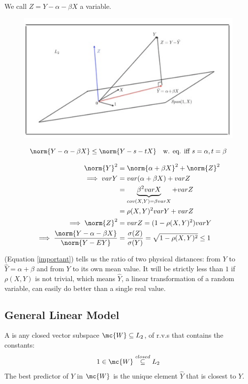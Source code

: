 \documentclass[11pt]{article}
\numberwithin{equation}{section}
\begin{document}
\remark
We call $Z = Y - \alpha - \beta X$ a  variable.

\begin{figure}[H]
	\centering
	\includegraphics[scale=0.5]{p3}
\end{figure}

\corollary
\begin{equation}
\norm{Y - \alpha - \beta X} \leq \norm{Y - s - tX} \quad \text{w. eq. iff $s=\alpha, t = \beta$}
\end{equation}

\begin{align}
	\norm{Y}^2 &= \norm{\alpha + \beta X}^2 + \norm{Z}^2 \\
	\implies varY &= var(\alpha + \beta X) + varZ \\
	&= \underbrace{\beta^2varX}_{cov(X,Y) = \beta varX} + varZ \\
	&= \rho(X, Y)^2 varY + varZ \\
	\implies \norm{Z}^2 &= varZ = (1 - \rho(X,Y)^2)varY \\
	\implies \frac{\norm{Y - \alpha - \beta X}}{\norm{Y - EY}} &= \frac{\sigma(Z)}{\sigma(Y)} = \sqrt{1 - \rho(X, Y)^2} \leq 1 \label{important}
\end{align}

\remark
(Equation \ref{important}) tells us the ratio of two physical distances: from $Y$ to $\hat{Y} = \alpha + \beta$ and from $Y$ to its own mean value. It will be strictly less than $1$ if $\rho(X, Y)$ is not trivial, which means $\hat{Y}$, a linear transformation of a random variable, can easily do better than a single real value.

\subsection{General Linear Model}
A  is any closed vector subspace $\mc{W} \subseteq L_2$, of r.v.s that contains the constants:
$$1 \in \mc{W} \overset{closed}{\subseteq} L_2$$ The best predictor of $Y$ in $\mc{W}$ is the unique element $\hat{Y}$ that is closest to $Y$.
\end{document}
